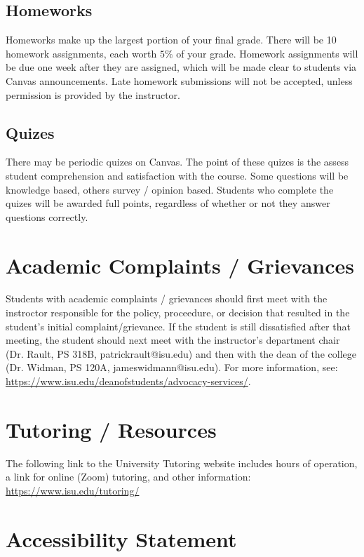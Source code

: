 \documentclass[11pt]{article}\usepackage[]{graphicx}\usepackage[]{xcolor}
\begin{document}
\subsection{Homeworks}

Homeworks make up the largest portion of your final grade. There will be 10 homework assignments, each worth $5\%$ of your grade.
Homework assignments will be due one week after they are assigned, which will be made clear to students via Canvas announcements.
Late homework submissions will not be accepted, unless permission is provided by the instructor.

\subsection{Quizes}

There may be periodic quizes on Canvas. The point of these quizes is the assess student comprehension and satisfaction with the course.
Some questions will be knowledge based, others survey / opinion based. 
Students who complete the quizes will be awarded full points, regardless of whether or not they answer questions correctly.

\section{Academic Complaints / Grievances}

Students with academic complaints / grievances should first meet with the instroctor responsible for the policy, proceedure, or decision that resulted in the student's initial complaint/grievance. If the student is still dissatisfied after that meeting, the student should next meet with the instructor's department chair (Dr. Rault, PS 318B, patrickrault@isu.edu) and then with the dean of the college (Dr. Widman, PS 120A, jameswidmann@isu.edu). For more information, see: \url{https://www.isu.edu/deanofstudents/advocacy-services/}.

\section{Tutoring / Resources}

The following link to the University Tutoring website includes hours of operation, a link for online (Zoom) tutoring, and other information: \url{https://www.isu.edu/tutoring/}

\section{Accessibility Statement}
\end{document}
